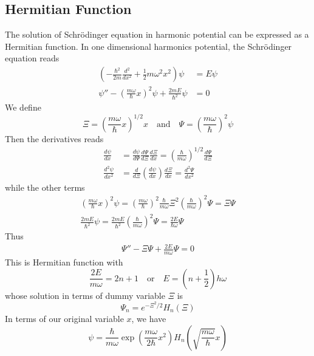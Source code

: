 \documentclass[../../main.tex]{subfiles}
\begin{document}
\subsection{Hermitian Function}
The solution of Schrödinger equation in harmonic potential can be expressed as a Hermitian function. In one dimensional harmonics potential, the Schrödinger equation reads
\begin{align*}
  \left(-\frac{\hbar^2}{2m}\frac{d^2}{dx^2}+\frac{1}{2}m\omega^2x^2\right)\psi&= E\psi\\
  \psi''-\left(\frac{m\omega}{\hbar}x\right)^2\psi+\frac{2mE}{\hbar^2}\psi&=0
\end{align*}
We define 
\begin{equation*}
  \Xi=\left(\frac{m\omega}{\hbar}x\right)^{1/2}x\quad\text{and}\quad\Psi=\left(\frac{m\omega}{\hbar}\right)^2\psi
\end{equation*}
Then the derivatives reads
\begin{align*}
  \frac{d\psi}{dx}&=\frac{d\psi}{d\Psi}\frac{d\Psi}{d\Xi}\frac{d\Xi}{dx}=\left(\frac{\hbar}{m\omega}\right)^{1/2}\frac{d\Psi}{d\Xi}\\
  \frac{d^2\psi}{dx^2}&=\frac{d}{d\Xi}\left(\frac{d\psi}{dx}\right)\frac{d\Xi}{dx}=\frac{d^2\Psi}{dx^2}
\end{align*}
while the other terms 
\begin{gather*}
  \left(\frac{m\omega}{\hbar}x\right)^2\psi=\left(\frac{m\omega}{\hbar}\right)^2\frac{\hbar}{m\omega}\Xi^2\left(\frac{\hbar}{m\omega}\right)^2\Psi=\Xi\Psi\\
  \frac{2mE}{\hbar^2}\psi=\frac{2mE}{\hbar^2}\left(\frac{\hbar}{m\omega}\right)^2\Psi=\frac{2E}{\hbar\omega}\Psi
\end{gather*}
Thus 
\begin{align*}
  \Psi''-\Xi\Psi+\frac{2E}{m\omega}\Psi=0
\end{align*}
This is Hermitian function with 
\begin{equation*}
  \frac{2E}{m\omega}=2n+1\quad\text{or}\quad E=\left(n+\frac{1}{2}\right)h\omega
\end{equation*}
whose solution in terms of dummy variable $\Xi$ is 
\begin{equation*}
  \Psi_n=e^{-\Xi^2/2}H_n(\Xi)
\end{equation*}
In terms of our original variable $x$, we have 
\begin{equation*}
  \psi=\frac{\hbar}{m\omega}\exp\left(\frac{m\omega}{2\hbar}x^2\right)H_n\left(\sqrt{\frac{m\omega}{\hbar}}x\right)
\end{equation*}
\end{document}
